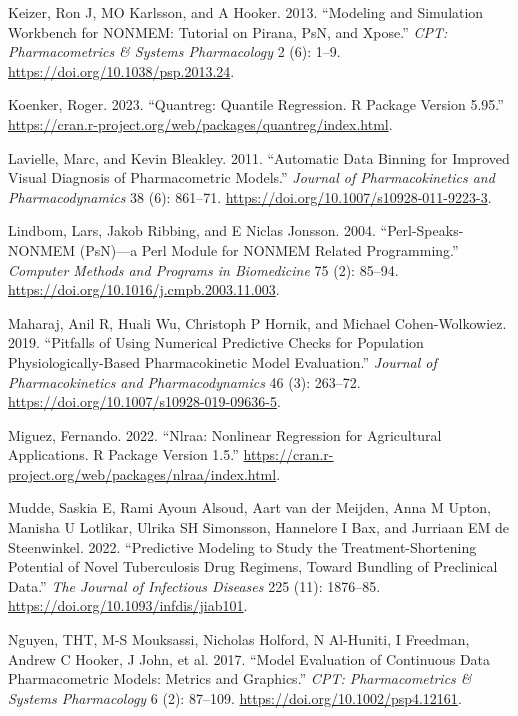 \begin{CSLReferences}{1}{0}
\leavevmode{}%
Keizer, Ron J, MO Karlsson, and A Hooker. 2013. {``Modeling and Simulation Workbench for NONMEM: Tutorial on Pirana, PsN, and Xpose.''} \emph{CPT: Pharmacometrics \& Systems Pharmacology} 2 (6): 1--9. \url{https://doi.org/10.1038/psp.2013.24}.

\leavevmode{}%
Koenker, Roger. 2023. {``Quantreg: Quantile Regression. R Package Version 5.95.''} \url{https://cran.r-project.org/web/packages/quantreg/index.html}.

\leavevmode{}%
Lavielle, Marc, and Kevin Bleakley. 2011. {``Automatic Data Binning for Improved Visual Diagnosis of Pharmacometric Models.''} \emph{Journal of Pharmacokinetics and Pharmacodynamics} 38 (6): 861--71. \url{https://doi.org/10.1007/s10928-011-9223-3}.

\leavevmode{}%
Lindbom, Lars, Jakob Ribbing, and E Niclas Jonsson. 2004. {``Perl-Speaks-NONMEM (PsN)---a Perl Module for NONMEM Related Programming.''} \emph{Computer Methods and Programs in Biomedicine} 75 (2): 85--94. \url{https://doi.org/10.1016/j.cmpb.2003.11.003}.

\leavevmode{}%
Maharaj, Anil R, Huali Wu, Christoph P Hornik, and Michael Cohen-Wolkowiez. 2019. {``Pitfalls of Using Numerical Predictive Checks for Population Physiologically-Based Pharmacokinetic Model Evaluation.''} \emph{Journal of Pharmacokinetics and Pharmacodynamics} 46 (3): 263--72. \url{https://doi.org/10.1007/s10928-019-09636-5}.

\leavevmode{}%
Miguez, Fernando. 2022. {``Nlraa: Nonlinear Regression for Agricultural Applications. R Package Version 1.5.''} \url{https://cran.r-project.org/web/packages/nlraa/index.html}.

\leavevmode{}%
Mudde, Saskia E, Rami Ayoun Alsoud, Aart van der Meijden, Anna M Upton, Manisha U Lotlikar, Ulrika SH Simonsson, Hannelore I Bax, and Jurriaan EM de Steenwinkel. 2022. {``Predictive Modeling to Study the Treatment-Shortening Potential of Novel Tuberculosis Drug Regimens, Toward Bundling of Preclinical Data.''} \emph{The Journal of Infectious Diseases} 225 (11): 1876--85. \url{https://doi.org/10.1093/infdis/jiab101}.

\leavevmode{}%
Nguyen, THT, M-S Mouksassi, Nicholas Holford, N Al-Huniti, I Freedman, Andrew C Hooker, J John, et al. 2017. {``Model Evaluation of Continuous Data Pharmacometric Models: Metrics and Graphics.''} \emph{CPT: Pharmacometrics \& Systems Pharmacology} 6 (2): 87--109. \url{https://doi.org/10.1002/psp4.12161}.


\end{CSLReferences}
